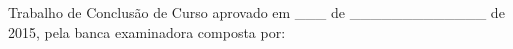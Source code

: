 \documentclass[
	12pt,				%
	openany,			%
	twoside,			%
	a4paper,			%
	english,			%
	french,				%
	spanish,			%
	brazil,				%
	oldfontcommands
	]{abntex2}
\begin{document}

%
% 
%
\begin{folhadeaprovacao}

  \begin{center}
    {\ABNTEXchapterfont\large\imprimirautor}

    \vspace*{\fill}\vspace*{\fill}
    \begin{center}
      \ABNTEXchapterfont\bfseries\Large\imprimirtitulo
    \end{center}
    \vspace*{\fill}
    
    \hspace{.45\textwidth}
    \begin{minipage}{.5\textwidth}
    \end{minipage}%
    \vspace*{\fill}
   \end{center}
        
Trabalho de Conclusão de Curso aprovado em \_\_\_ de \_\_\_\_\_\_\_\_\_\_\_\_\_ de 2015, pela banca examinadora composta por: 

      
   \begin{center}
    \vspace*{0.5cm}
    {\large\imprimirlocal}
    \par
    {\large\imprimirdata}
    \vspace*{1cm}
  \end{center}
  
\end{folhadeaprovacao}

\end{document}
